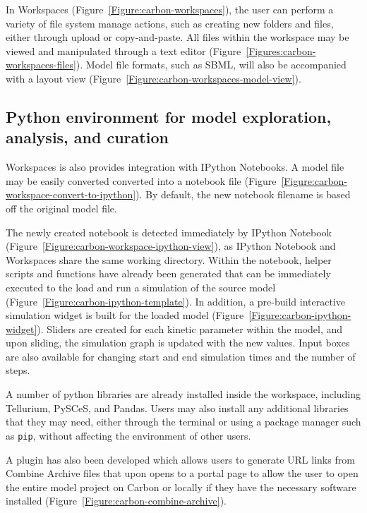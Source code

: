 In Workspaces (Figure~\ref{Figure:carbon-workspaces}), the user can perform a variety of file system manage actions, such as creating new folders and files, either through upload or copy-and-paste.
All files within the workspace may be viewed and manipulated through a text editor (Figure~\ref{Figures:carbon-workspaces-files}).
Model file formats, such as SBML, will also be accompanied with a layout view (Figure~\ref{Figure:carbon-workspaces-model-view}).

\subsection{Python environment for model exploration, analysis, and curation}

Workspaces is also provides integration with IPython Notebooks.
A model file may be easily converted converted into a notebook file (Figure~\ref{Figure:carbon-workspace-convert-to-ipython}).
By default, the new notebook filename is based off the original model file.

The newly created notebook is detected immediately by IPython Notebook (Figure~\ref{Figure:carbon-workspace-ipython-view}), as IPython Notebook and Workspaces share the same working directory.
Within the notebook, helper scripts and functions have already been generated that can be immediately executed to the load and run a simulation of the source model (Figure~\ref{Figure:carbon-ipython-template}).
In addition, a pre-build interactive simulation widget is built for the loaded model (Figure~\ref{Figure:carbon-ipython-widget}).
Sliders are created for each kinetic parameter within the model, and upon sliding, the simulation graph is updated with the new values.
Input boxes are also available for changing start and end simulation times and the number of steps.

A number of python libraries are already installed inside the workspace, including Tellurium, PySCeS, and Pandas.
Users may also install any additional libraries that they may need, either through the terminal or using a package manager such as \texttt{pip}, without affecting the environment of other users.

A plugin has also been developed which allows users to generate URL links from Combine Archive files that upon opens to a portal page to allow the user to open the entire model project on Carbon or locally if they have the necessary software installed (Figure~\ref{Figure:carbon-combine-archive}).

\autocite{ragan2013collaborative}

